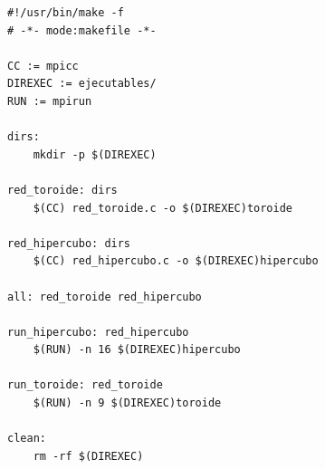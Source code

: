\documentclass{article}
\begin{document}
\begin{lstlisting}
#!/usr/bin/make -f
# -*- mode:makefile -*-

CC := mpicc
DIREXEC := ejecutables/
RUN := mpirun

dirs:
	mkdir -p $(DIREXEC)

red_toroide: dirs
	$(CC) red_toroide.c -o $(DIREXEC)toroide

red_hipercubo: dirs
	$(CC) red_hipercubo.c -o $(DIREXEC)hipercubo

all: red_toroide red_hipercubo

run_hipercubo: red_hipercubo
	$(RUN) -n 16 $(DIREXEC)hipercubo

run_toroide: red_toroide
	$(RUN) -n 9 $(DIREXEC)toroide

clean:
	rm -rf $(DIREXEC)



\end{lstlisting}
 
 

\newpage
\end{document}
